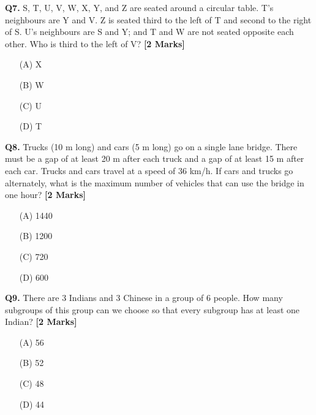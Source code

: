 \documentclass[11pt]{article}
\newcommand{\questionb}[2]{
    \noindent\textbf{Q#2.} #1 \hfill \textbf{[2 Marks]}
}
\begin{document}
\vspace{0.5cm}

\questionb{S, T, U, V, W, X, Y, and Z are seated around a circular table. T's neighbours are Y and V. Z is seated third to the left of T and second to the right of S. U's neighbours are S and Y; and T and W are not seated opposite each other. Who is third to the left of V?}{7}
\begin{enumerate}
    \item[(A)] X
    \item[(B)] W  
    \item[(C)] U
    \item[(D)] T
\end{enumerate}

\vspace{0.5cm}

\questionb{Trucks (10 m long) and cars (5 m long) go on a single lane bridge. There must be a gap of at least 20 m after each truck and a gap of at least 15 m after each car. Trucks and cars travel at a speed of 36 km/h. If cars and trucks go alternately, what is the maximum number of vehicles that can use the bridge in one hour?}{8}
\begin{enumerate}
    \item[(A)] 1440
    \item[(B)] 1200  
    \item[(C)] 720
    \item[(D)] 600
\end{enumerate}

\vspace{0.5cm}

\questionb{There are 3 Indians and 3 Chinese in a group of 6 people. How many subgroups of this group can we choose so that every subgroup has at least one Indian?}{9}
\begin{enumerate}
    \item[(A)] 56
    \item[(B)] 52  
    \item[(C)] 48
    \item[(D)] 44
\end{enumerate}

\vspace{0.5cm}
\end{document}
